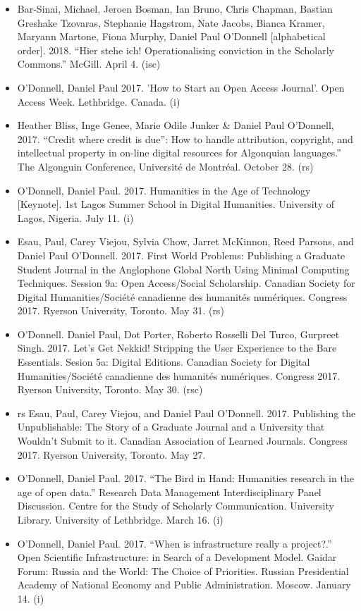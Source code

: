 \documentclass[12pt]{article}
\begin{document}
\begin{itemize}
  \item Bar-Sinai, Michael, Jeroen Bosman, Ian Bruno, Chris Chapman, Bastian Greshake Tzovaras, Stephanie Hagstrom, Nate Jacobs\*, Bianca Kramer, Maryann Martone, Fiona Murphy, Daniel Paul O'Donnell [alphabetical order]. 2018. “Hier stehe ich! Operationalising conviction in the Scholarly Commons.” McGill. April 4. (isc)
  \item O'Donnell, Daniel Paul 2017. 'How to Start an Open Access Journal'. Open Access Week. Lethbridge. Canada. (i)
  \item Heather Bliss\*, Inge Genee, Marie Odile Junker \& Daniel Paul O’Donnell, 2017. “Credit where credit is due”: How to handle attribution, copyright, and intellectual property in on-line digital resources for Algonquian languages.” The Algonguin Conference, Université de Montréal. October 28. (rs)
  \item O’Donnell, Daniel Paul. 2017. Humanities in the Age of Technology [Keynote]. 1st Lagos Summer School in Digital Humanities. University of Lagos, Nigeria. July 11. (i)
  \item Esau\*, Paul, Carey Viejou\*, Sylvia Chow\*, Jarret McKinnon\*, Reed Parsons\*, and Daniel Paul O'Donnell. 2017. First World Problems: Publishing a Graduate Student Journal in the Anglophone Global North Using Minimal Computing Techniques. Session 9a: Open Access/Social Scholarship. Canadian Society for Digital Humanities/Société canadienne des humanités numériques. Congress 2017. Ryerson University, Toronto. May 31. (rs)
  \item O’Donnell. Daniel Paul, Dot Porter, Roberto Rosselli Del Turco, Gurpreet Singh\*. 2017. Let’s Get Nekkid! Stripping the User Experience to the Bare Essentials. Sesion 5a: Digital Editions. Canadian Society for Digital Humanities/Société canadienne des humanités numériques. Congress 2017. Ryerson University, Toronto. May 30. (rsc)
  \item rs Esau\*, Paul, Carey Viejou\*, and Daniel Paul O’Donnell. 2017. Publishing the Unpublishable: The Story of a Graduate Journal and a University that Wouldn’t Submit to it. Canadian Association of Learned Journals. Congress 2017. Ryerson University, Toronto. May 27.
  \item O’Donnell, Daniel Paul. 2017. “The Bird in Hand: Humanities research in the age of open data.” Research Data Management Interdisciplinary Panel Discussion. Centre for the Study of Scholarly Communication. University Library. University of Lethbridge. March 16. (i)
  \item O’Donnell, Daniel Paul. 2017. “When is infrastructure really a project?.” Open Scientific Infrastructure: in Search of a Development Model. Gaidar Forum: Russia and the World: The Choice of Priorities. Russian Presidential Academy of National Economy and Public Administration. Moscow. January 14. (i)

\end{itemize}
\end{document}

